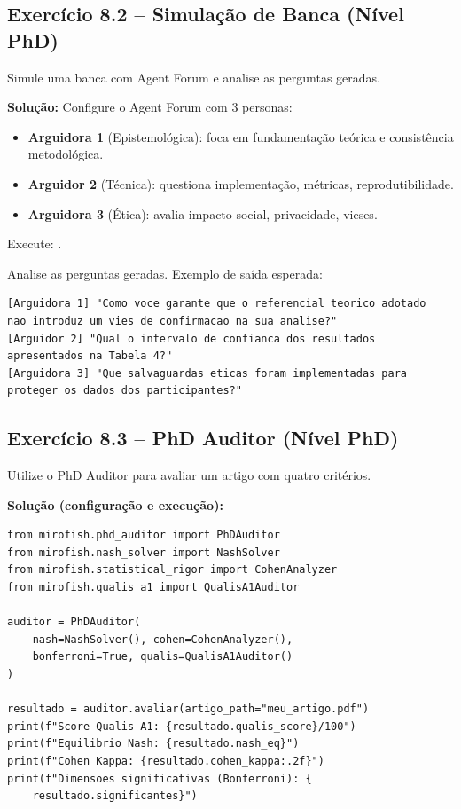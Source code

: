 \subsection*{Exercício 8.2 -- Simulação de Banca (Nível PhD)}
Simule uma banca com Agent Forum e analise as perguntas geradas.

\textbf{Solução:} Configure o Agent Forum com 3 personas:
\begin{itemize}
\item \textbf{Arguidora 1} (Epistemológica): foca em fundamentação teórica
e consistência metodológica.
\item \textbf{Arguidor 2} (Técnica): questiona implementação, métricas,
reprodutibilidade.
\item \textbf{Arguidora 3} (Ética): avalia impacto social, privacidade,
vieses.
\end{itemize}

Execute: .

Analise as perguntas geradas. Exemplo de saída esperada:
\begin{verbatim}
[Arguidora 1] "Como voce garante que o referencial teorico adotado
nao introduz um vies de confirmacao na sua analise?"
[Arguidor 2] "Qual o intervalo de confianca dos resultados
apresentados na Tabela 4?"
[Arguidora 3] "Que salvaguardas eticas foram implementadas para
proteger os dados dos participantes?"
\end{verbatim}

\subsection*{Exercício 8.3 -- PhD Auditor (Nível PhD)}
Utilize o PhD Auditor para avaliar um artigo com quatro critérios.

\textbf{Solução (configuração e execução):}
\begin{lstlisting}[style=pythonstyle]
from mirofish.phd_auditor import PhDAuditor
from mirofish.nash_solver import NashSolver
from mirofish.statistical_rigor import CohenAnalyzer
from mirofish.qualis_a1 import QualisA1Auditor

auditor = PhDAuditor(
    nash=NashSolver(), cohen=CohenAnalyzer(),
    bonferroni=True, qualis=QualisA1Auditor()
)

resultado = auditor.avaliar(artigo_path="meu_artigo.pdf")
print(f"Score Qualis A1: {resultado.qualis_score}/100")
print(f"Equilibrio Nash: {resultado.nash_eq}")
print(f"Cohen Kappa: {resultado.cohen_kappa:.2f}")
print(f"Dimensoes significativas (Bonferroni): {
    resultado.significantes}")
\end{lstlisting}

